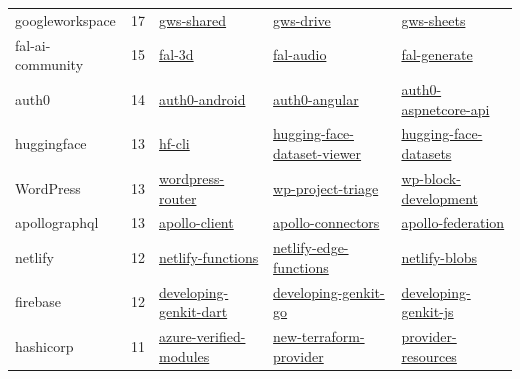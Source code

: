 \documentclass[UTF8,a4paper,12pt]{ctexart}
\begin{document}
\begin{longtable}{p{2.8cm} r p{4.2cm} p{4.2cm} p{4.2cm}}
googleworkspace & 17 & \href{https://officialskills.sh/googleworkspace/skills/gws-shared}{gws-shared} & \href{https://officialskills.sh/googleworkspace/skills/gws-drive}{gws-drive} & \href{https://officialskills.sh/googleworkspace/skills/gws-sheets}{gws-sheets} \\
fal-ai-community & 15 & \href{https://officialskills.sh/fal-ai-community/skills/fal-3d}{fal-3d} & \href{https://officialskills.sh/fal-ai-community/skills/fal-audio}{fal-audio} & \href{https://officialskills.sh/fal-ai-community/skills/fal-generate}{fal-generate} \\
auth0 & 14 & \href{https://officialskills.sh/auth0/skills/auth0-android}{auth0-android} & \href{https://officialskills.sh/auth0/skills/auth0-angular}{auth0-angular} & \href{https://officialskills.sh/auth0/skills/auth0-aspnetcore-api}{auth0-aspnetcore-api} \\
huggingface & 13 & \href{https://officialskills.sh/huggingface/skills/hf-cli}{hf-cli} & \href{https://officialskills.sh/huggingface/skills/hugging-face-dataset-viewer}{hugging-face-dataset-viewer} & \href{https://officialskills.sh/huggingface/skills/hugging-face-datasets}{hugging-face-datasets} \\
WordPress & 13 & \href{https://officialskills.sh/WordPress/skills/wordpress-router}{wordpress-router} & \href{https://officialskills.sh/WordPress/skills/wp-project-triage}{wp-project-triage} & \href{https://officialskills.sh/WordPress/skills/wp-block-development}{wp-block-development} \\
apollographql & 13 & \href{https://officialskills.sh/apollographql/skills/apollo-client}{apollo-client} & \href{https://officialskills.sh/apollographql/skills/apollo-connectors}{apollo-connectors} & \href{https://officialskills.sh/apollographql/skills/apollo-federation}{apollo-federation} \\
netlify & 12 & \href{https://officialskills.sh/netlify/skills/netlify-functions}{netlify-functions} & \href{https://officialskills.sh/netlify/skills/netlify-edge-functions}{netlify-edge-functions} & \href{https://officialskills.sh/netlify/skills/netlify-blobs}{netlify-blobs} \\
firebase & 12 & \href{https://officialskills.sh/firebase/skills/developing-genkit-dart}{developing-genkit-dart} & \href{https://officialskills.sh/firebase/skills/developing-genkit-go}{developing-genkit-go} & \href{https://officialskills.sh/firebase/skills/developing-genkit-js}{developing-genkit-js} \\
hashicorp & 11 & \href{https://officialskills.sh/hashicorp/skills/azure-verified-modules}{azure-verified-modules} & \href{https://officialskills.sh/hashicorp/skills/new-terraform-provider}{new-terraform-provider} & \href{https://officialskills.sh/hashicorp/skills/provider-resources}{provider-resources} \\

\end{longtable}
\end{document}
